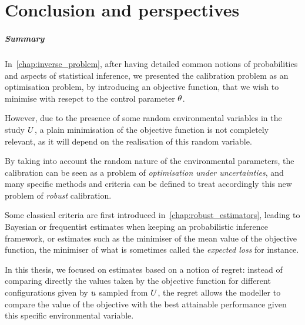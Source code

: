 \documentclass[../../Main_ManuscritThese.tex]{subfiles}
\begin{document}
\pagestyle{conclusionStyle}



\TitleBtwLines
\chapter*{Conclusion and perspectives}
{}
\label{chap:Conclusion}
\renewcommand{\thesection}{} %

\paragraph{Summary}
In~\cref{chap:inverse_problem}, after having detailed common notions
of probabilities and aspects of statistical inference, we presented
the calibration problem as an optimisation problem, by introducing an
objective function, that we wish to minimise with resepct to the
control parameter $\theta$.

However, due to the presence of some random environmental variables in
the study $U$, a plain minimisation of the objective function is not
completely relevant, as it will depend on the realisation of this
random variable.

By taking into account the random nature of the {environmental
  parameters}, the calibration can be seen as a problem of
\emph{optimisation under uncertainties}, and many specific methods and
criteria can be defined to treat accordingly this new problem of
\emph{robust} calibration.


Some classical criteria are first introduced
in~\cref{chap:robust_estimators}, leading to Bayesian or frequentist
estimates when keeping an probabilistic inference framework, or
estimates such as the minimiser of the mean value of the objective
function, the minimiser of what is sometimes called the \emph{expected loss} for instance.

In this thesis, we focused on estimates based on a notion of regret:
instead of comparing directly the values taken by the objective
function for different configurations given by $u$ sampled from
$U$, the regret allows the modeller to compare the value of the
objective with the best attainable performance given this specific
environmental variable.
\end{document}
